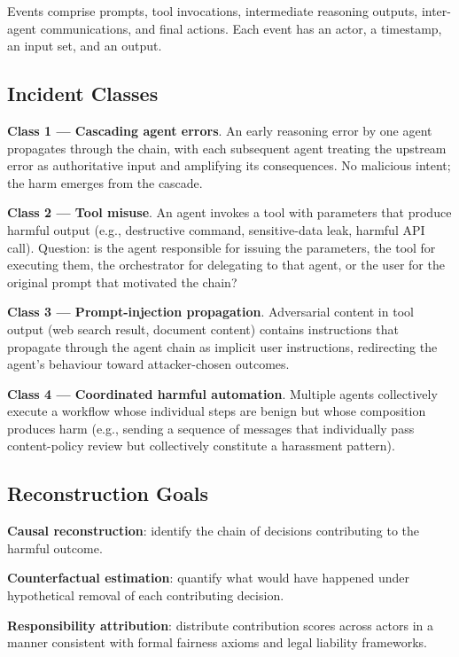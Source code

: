\documentclass[sigconf,nonacm]{acmart}
\begin{document}
Events comprise prompts, tool invocations, intermediate reasoning
outputs, inter-agent communications, and final actions. Each event
has an actor, a timestamp, an input set, and an output.

\subsection{Incident Classes}

\textbf{Class 1 --- Cascading agent errors}. An early reasoning
error by one agent propagates through the chain, with each
subsequent agent treating the upstream error as authoritative input
and amplifying its consequences. No malicious intent; the harm
emerges from the cascade.

\textbf{Class 2 --- Tool misuse}. An agent invokes a tool with
parameters that produce harmful output (e.g., destructive command,
sensitive-data leak, harmful API call). Question: is the agent
responsible for issuing the parameters, the tool for executing
them, the orchestrator for delegating to that agent, or the user
for the original prompt that motivated the chain?

\textbf{Class 3 --- Prompt-injection propagation}. Adversarial
content in tool output (web search result, document content)
contains instructions that propagate through the agent chain as
implicit user instructions, redirecting the agent's behaviour
toward attacker-chosen outcomes.

\textbf{Class 4 --- Coordinated harmful automation}. Multiple
agents collectively execute a workflow whose individual steps are
benign but whose composition produces harm (e.g., sending a
sequence of messages that individually pass content-policy review
but collectively constitute a harassment pattern).

\subsection{Reconstruction Goals}

\textbf{Causal reconstruction}: identify the chain of decisions
contributing to the harmful outcome.

\textbf{Counterfactual estimation}: quantify what would have
happened under hypothetical removal of each contributing decision.

\textbf{Responsibility attribution}: distribute contribution
scores across actors in a manner consistent with formal fairness
axioms and legal liability frameworks.
\end{document}
